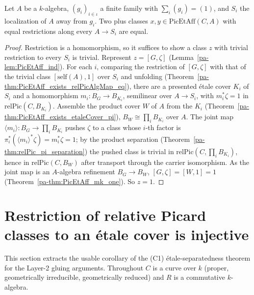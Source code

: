 \begin{theorem}
  \label{pa-thm:PicEtAff_eq_of_away_eq}
  \leanok

  Let \(A\) be a \(k\)-algebra, \((g_i)_{i \in \iota}\) a finite family with \(\sum_i (g_i) = (1)\),
  and \(S_i\) the localization of \(A\) away from \(g_i\). Two plus classes \(x, y \in
  \mathrm{PicEtAff}(C, A)\) with equal restrictions along every \(A \to S_i\) are equal.
\end{theorem}
\begin{proof}
  \leanok
  Restriction is a homomorphism, so it suffices to show a class \(z\) with trivial restriction to
  every \(S_i\) is trivial. Represent \(z = [G, \zeta]\) (Lemma~\ref{pa-lem:PicEtAff_ind}). For each
  \(i\), comparing the restriction of \([G, \zeta]\) with that of the trivial class
  \([\mathrm{self}(A), 1]\) over \(S_i\) and unfolding (Theorem~\ref{pa-thm:PicEtAff_exists_relPicAlgMap_eq}),
  there are a presented \'etale cover \(K_i\) of \(S_i\) and a homomorphism \(m_i \colon B_G \to
  B_{K_i}\), semilinear over \(A \to S_i\), with \(m_i^{*}\zeta = 1\) in \(\mathrm{relPic}(C,
  B_{K_i})\). Assemble the product cover \(W\) of \(A\) from the \(K_i\)
  (Theorem~\ref{pa-thm:PicEtAff_exists_etaleCover_pi}), \(B_W \cong \prod_i B_{K_i}\) over \(A\). The
  joint map \(\langle m_i \rangle \colon B_G \to \prod_i B_{K_i}\) pushes \(\zeta\) to a class whose
  \(i\)-th factor is \(\pi_i^{*}(\langle m_i\rangle^{*}\zeta) = m_i^{*}\zeta = 1\); by the product
  separation (Theorem~\ref{pa-thm:relPic_pi_separation}) the pushed class is trivial in
  \(\mathrm{relPic}(C, \prod_i B_{K_i})\), hence in \(\mathrm{relPic}(C, B_W)\) after transport
  through the carrier isomorphism. As the joint map is an \(A\)-algebra refinement \(B_G \to B_W\),
  \([G, \zeta] = [W, 1] = 1\) (Theorem~\ref{pa-thm:PicEtAff_mk_one}). So \(z = 1\).
\end{proof}

\section{Restriction of relative Picard classes to an \'etale cover is injective}

This section extracts the usable corollary of the (C1) \'etale-separatedness theorem for the
Layer-2 gluing arguments. Throughout \(C\) is a curve over \(k\) (proper, geometrically irreducible,
geometrically reduced) and \(R\) is a commutative \(k\)-algebra.


